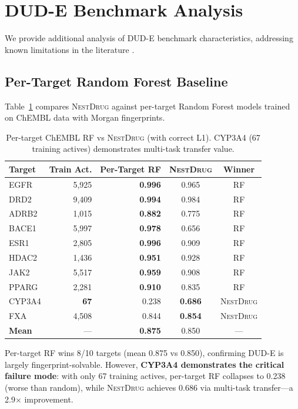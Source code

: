 \documentclass[sigconf,anonymous]{acmart}
\newcommand{\methodname}{\textsc{NestDrug}}
\begin{document}
\section{DUD-E Benchmark Analysis}
\label{app:dude_analysis}

We provide additional analysis of DUD-E benchmark characteristics, addressing known limitations in the literature \cite{wallach_2018_dude_bias}.

\subsection{Per-Target Random Forest Baseline}

Table~\ref{tab:per_target_rf} compares \methodname{} against per-target Random Forest models trained on ChEMBL data with Morgan fingerprints.

\begin{table}[t]
\caption{Per-target ChEMBL RF vs \methodname{} (with correct L1). CYP3A4 (67 training actives) demonstrates multi-task transfer value.}
\label{tab:per_target_rf}
\centering
\small
\begin{tabular}{@{}lrrcc@{}}
\toprule
Target & Train Act. & Per-Target RF & \methodname{} & Winner \\
\midrule
EGFR & 5,925 & \textbf{0.996} & 0.965 & RF \\
DRD2 & 9,409 & \textbf{0.994} & 0.984 & RF \\
ADRB2 & 1,015 & \textbf{0.882} & 0.775 & RF \\
BACE1 & 5,997 & \textbf{0.978} & 0.656 & RF \\
ESR1 & 2,805 & \textbf{0.996} & 0.909 & RF \\
HDAC2 & 1,436 & \textbf{0.951} & 0.928 & RF \\
JAK2 & 5,517 & \textbf{0.959} & 0.908 & RF \\
PPARG & 2,281 & \textbf{0.910} & 0.835 & RF \\
CYP3A4 & \textbf{67} & 0.238 & \textbf{0.686} & \methodname{} \\
FXA & 4,508 & 0.844 & \textbf{0.854} & \methodname{} \\
\midrule
\textbf{Mean} & --- & \textbf{0.875} & 0.850 & --- \\
\bottomrule
\end{tabular}
\end{table}

Per-target RF wins 8/10 targets (mean 0.875 vs 0.850), confirming DUD-E is largely fingerprint-solvable. However, \textbf{CYP3A4 demonstrates the critical failure mode}: with only 67 training actives, per-target RF collapses to 0.238 (worse than random), while \methodname{} achieves 0.686 via multi-task transfer---a 2.9$\times$ improvement.
\end{document}
